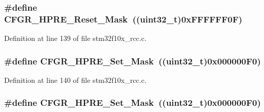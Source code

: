 \subsubsection[{\texorpdfstring{C\+F\+G\+R\+\_\+\+H\+P\+R\+E\+\_\+\+Reset\+\_\+\+Mask}{CFGR_HPRE_Reset_Mask}}]{\setlength{\rightskip}{0pt plus 5cm}\#define C\+F\+G\+R\+\_\+\+H\+P\+R\+E\+\_\+\+Reset\+\_\+\+Mask~(({\bf uint32\+\_\+t})0x\+F\+F\+F\+F\+F\+F0\+F)}\hypertarget{group___r_c_c___private___defines_ga55937d93be56562243d92c507145112c}{}\label{group___r_c_c___private___defines_ga55937d93be56562243d92c507145112c}


Definition at line 139 of file stm32f10x\+\_\+rcc.\+c.

\subsubsection[{\texorpdfstring{C\+F\+G\+R\+\_\+\+H\+P\+R\+E\+\_\+\+Set\+\_\+\+Mask}{CFGR_HPRE_Set_Mask}}]{\setlength{\rightskip}{0pt plus 5cm}\#define C\+F\+G\+R\+\_\+\+H\+P\+R\+E\+\_\+\+Set\+\_\+\+Mask~(({\bf uint32\+\_\+t})0x000000\+F0)}\hypertarget{group___r_c_c___private___defines_gaca06c6cc484e08423a56cfca6928b9ae}{}\label{group___r_c_c___private___defines_gaca06c6cc484e08423a56cfca6928b9ae}


Definition at line 140 of file stm32f10x\+\_\+rcc.\+c.

\subsubsection[{\texorpdfstring{C\+F\+G\+R\+\_\+\+H\+P\+R\+E\+\_\+\+Set\+\_\+\+Mask}{CFGR_HPRE_Set_Mask}}]{\setlength{\rightskip}{0pt plus 5cm}\#define C\+F\+G\+R\+\_\+\+H\+P\+R\+E\+\_\+\+Set\+\_\+\+Mask~(({\bf uint32\+\_\+t})0x000000\+F0)}\hypertarget{group___r_c_c___private___defines_gaca06c6cc484e08423a56cfca6928b9ae}{}\label{group___r_c_c___private___defines_gaca06c6cc484e08423a56cfca6928b9ae}


